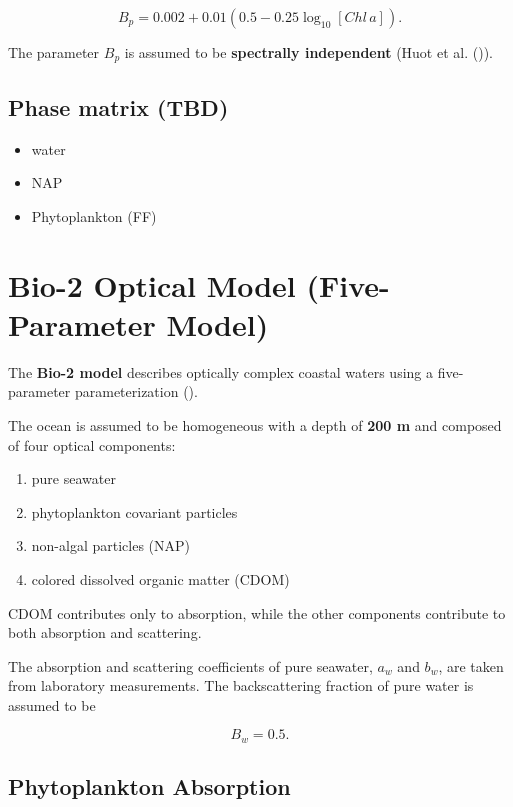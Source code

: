 \documentclass[
  11pt,
  letterpaper,
]{scrreprt}
\providecommand{\tightlist}{%
  \setlength{\itemsep}{0pt}\setlength{\parskip}{0pt}}
\begin{document}
\[
B_p = 0.002 + 0.01\left(0.5 - 0.25\log_{10}[Chl\,a]\right).
\]

The parameter \(B_p\) is assumed to be \textbf{spectrally independent}
(Huot et al. ()).

\subsection{Phase matrix (TBD)}\label{phase-matrix-tbd}

\begin{itemize}
\tightlist
\item
  water
\item
  NAP
\item
  Phytoplankton (FF)
\end{itemize}

\section{Bio-2 Optical Model (Five-Parameter
Model)}\label{bio-2-optical-model-five-parameter-model}

The \textbf{Bio-2 model} describes optically complex coastal waters
using a five-parameter parameterization ().

The ocean is assumed to be homogeneous with a depth of \textbf{200 m}
and composed of four optical components:

\begin{enumerate}
\def\labelenumi{\arabic{enumi}.}
\tightlist
\item
  pure seawater
\item
  phytoplankton covariant particles
\item
  non-algal particles (NAP)
\item
  colored dissolved organic matter (CDOM)
\end{enumerate}

CDOM contributes only to absorption, while the other components
contribute to both absorption and scattering.

The absorption and scattering coefficients of pure seawater, \(a_w\) and
\(b_w\), are taken from laboratory measurements. The backscattering
fraction of pure water is assumed to be

\[
B_w = 0.5.
\]

\subsection{Phytoplankton Absorption}\label{phytoplankton-absorption-1}
\end{document}
